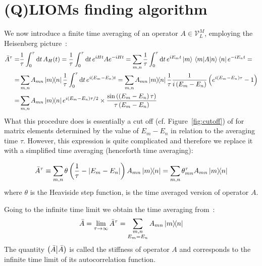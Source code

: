 \section{(Q)LIOMs finding algorithm\label{sec:algorithm}}
We now introduce a finite time averaging of an operator \(A\in \mathcal{V}_L^M\), employing the Heisenberg picture~\autocite{Mierzejewski2015Approx}:
\begin{align}
  \bar{A}^{\tau} = & \frac{1}{\tau} \int_0^{\tau} \mathrm{d}t\, A_{H}(t) = \frac{1}{\tau} \int_0^{\tau} \mathrm{d}t\, e^{i H t}A e^{-i H t}
  =\sum_{m,n} \frac{1}{\tau} \int_0^{\tau} \mathrm{d}t\, e^{i E_m t}\ket{m} \matrixel{m}{A}{n}\bra{n}  e^{-i E_n t} = \nonumber{}           \\
  =                & \sum_{m,n} A_{mn}\ketbra{m}{n} \frac{1}{\tau} \int_0^{\tau} \mathrm{d}t \, e^{i(E_m-E_n)t} =
  \sum_{m,n} A_{mn}\ketbra{m}{n} \frac{1}{\tau} \frac{1}{i\left(E_m-E_n\right)}\left(e^{i\left(E_m-E_n\right)\tau}-1\right) \nonumber       \\
  =                & \sum_{m,n} A_{mn}\ketbra{m}{n}
  e^{i\left(E_m-E_n\right)\tau/2}\times \frac{\sin{\left(\left(E_m-E_n\right)\tau\right)}}{\tau\left(E_m-E_n\right)}
  \label{eq:time_avg}
\end{align}
What this procedure does is essentially a cut off (cf. Figure~\ref{fig:cutoff}) of for matrix elements determined by the value of \(E_m-E_n\) in relation
to the averaging time \(\tau{}\). However, this expression is quite complicated and therefore we replace it with a simplified time
averaging (henceforth time averaging):
\begin{definition}
  \begin{equation}
    \bar{A}^{\tau} \equiv \sum_{m,n} \theta\left(\frac{1}{\tau} - \abs{E_m-E_n}\right) A_{mn} \ketbra{m}{n}
    = \sum_{m,n} \theta_{mn}^{\tau} A_{mn} \ketbra{m}{n}
  \end{equation}
  \label{def:simple time avg}
  where \(\theta{}\) is the Heaviside step function, is the time averaged version of operator \(A\).
\end{definition}
Going to the infinite time limit we obtain the time averaging
from~\textcite{Mierzejewski2015a}:
\begin{equation}
  \bar{A} = \lim_{\tau \to \infty} \bar{A}^{\tau} = \sum_{ \substack{m,n\\E_m=E_n} } A_{mn} \ketbra{m}{n}
  \label{eq:inf time avg}
\end{equation}
The quantity \(\left(\bar{A} \middle| \bar{A}\right)\) is called the stiffness of operator \(A\) and corresponds to the infinite time limit
of its autocorrelation function.

